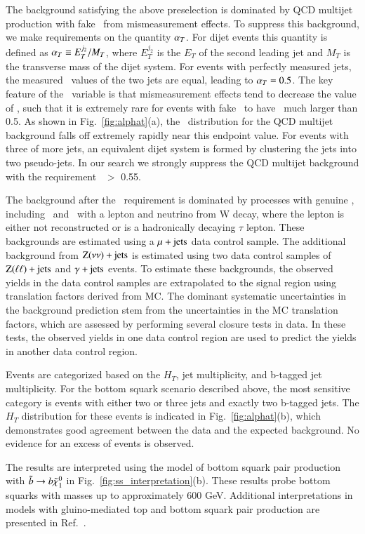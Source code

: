 The background satisfying the above preselection is dominated by QCD multijet production with fake \met\ from mismeasurement effects. To suppress this background,
we make requirements on the quantity $\alpha_{T}$. For dijet events this quantity is defined as $\alpha_{T} \equiv E_{T}^{j_2} / M_{T}$, where $E_{T}^{j_2}$ is the $E_T$
of the second leading jet and $M_T$ is the transverse mass of the dijet system. 
For events with perfectly measured jets, the measured \pt\ values of the two jets are equal, leading to $\alpha_{T}=0.5$. The key feature of the \alphat\ variable
is that mismeasurement effects tend to decrease the value of \alphat, such that it is extremely rare for events with fake \met\ to have \alphat\
much larger than 0.5. As shown in Fig.~\ref{fig:alphat}(a), the \alphat\ distribution for the QCD multijet background falls off extremely rapidly near this endpoint value.
For events with three of more jets, an equivalent dijet system is formed by  clustering the jets into two pseudo-jets. In our search we strongly suppress the
QCD multijet background with the requirement \alphat\ $>$ 0.55.

The background after the \alphat\ requirement is dominated by processes with genuine \met, including \ttljets\ and \wjets\ with a lepton and neutrino from W decay,
where the lepton is either not reconstructed or is a hadronically decaying $\tau$ lepton. 
These backgrounds are estimated using a $\mu+\rm{jets}$ data control sample.
The additional background from $\rm{Z}(\nu\nu)+\rm{jets}$ is estimated using two data control samples of $\rm{Z}(\ell\ell)+\rm{jets}$ and  $\gamma+\rm{jets}$ events. To estimate these backgrounds, the observed yields in the data control samples are extrapolated to the
signal region using translation factors derived from MC. The dominant systematic uncertainties in the background prediction stem from the uncertainties
in the MC translation factors, which are assessed by performing several closure tests in data. In these tests, the observed yields in one data control region
are used to predict the yields in another data control region.

Events are categorized based on the $H_T$, jet multiplicity, and b-tagged jet multiplicity. For the bottom squark scenario described above, the most sensitive
category is events with either two or three jets and exactly two b-tagged jets. The $H_T$ distribution for these events is indicated in Fig.~\ref{fig:alphat}(b),
which demonstrates good agreement between the data and the expected background. No evidence for an excess of events is observed.

The results are interpreted  using the model of bottom squark pair production with $\tilde{b}\to b\tilde{\chi}_{1}^{0}$ in Fig.~\ref{fig:ss_interpretation}(b).
These results probe bottom squarks with masses up to approximately 600 GeV. Additional interpretations in models with gluino-mediated
top and bottom squark pair production are presented in Ref.~\cite{ref:alphat}.

